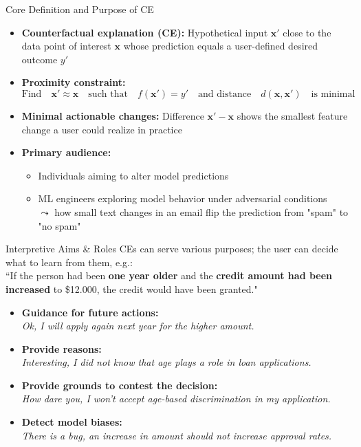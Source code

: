\documentclass[10pt,compress,t,notes=noshow, xcolor=table]{beamer}
\begin{document}
\begin{frame}{Core Definition and Purpose of CE}
  \begin{itemize}
    \item<1-> \textbf{Counterfactual explanation (CE):} Hypothetical input \(\mathbf{x}'\) close to the data point of interest $\mathbf{x}$ whose prediction equals a user-defined desired outcome \(y'\)
    \item<2-> \textbf{Proximity constraint:} %
      \[
      \text{Find} \quad \mathbf{x}' \approx \mathbf{x} \quad\text{such that} \quad f(\mathbf{x}') = y' \quad\text{and distance}\quad 
        d(\mathbf{x},\mathbf{x}') \quad \text{is minimal}
      \]
    \item<3-> \textbf{Minimal actionable changes:} Difference \(\mathbf{x}'-\mathbf{x}\) shows the smallest feature change a user could realize in practice
    \item<4-> \textbf{Primary audience:} 
    \begin{itemize}
        \item Individuals aiming to alter model predictions 
        \item ML engineers exploring model behavior under adversarial conditions\\
        $\leadsto$ how small text changes in an email flip the prediction from "spam" to "no spam"
    \end{itemize}
  \end{itemize}
\end{frame}


\begin{frame}{Interpretive Aims \& Roles}
	CEs can serve various purposes; the user can decide what to learn from them, e.g.:  \\[0.2cm]
	``If the person had been \textbf{one year older} and the \textbf{credit amount had been increased} to \$12.000, the credit would have been granted."  \\[0.2cm]
	\pause
	\begin{itemize}[<+->]
		\itemsep1.2em
		\item \textbf{Guidance for future actions:}\\ \textit{Ok, I will apply again next year for the higher amount.}
		\item \textbf{Provide reasons:}\\ \textit{Interesting, I did not know that age plays a role in loan applications.}
		\item \textbf{Provide grounds to contest the decision:}\\ \textit{How dare you, I won’t accept age-based discrimination in my application.}
		\item \textbf{Detect model biases:}\\ \textit{There is a bug, an increase in amount should not increase approval rates.}
	\end{itemize}
\end{frame}
\end{document}
